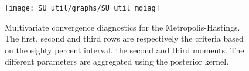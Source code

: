  
\begin{figure}[H]
\centering 
\texttt{[image: SU\_util/graphs/SU\_util\_mdiag]}
\caption{Multivariate convergence diagnostics for the Metropolis-Hastings.
The first, second and third rows are respectively the criteria based on
the eighty percent interval, the second and third moments. The different 
parameters are aggregated using the posterior kernel.}\label{Fig:MultivariateDiagnostics}
\end{figure}

